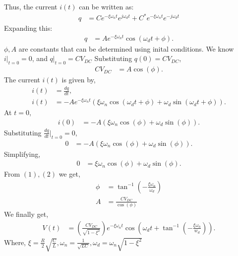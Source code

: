 \documentclass[a4paper,12pt]{article}
\begin{document}
Thus, the current $i(t)$ can be written as:
\begin{align*}
    q &= Ce^{-\xi \omega_n t} e^{j\omega_d t} + C^{*}e^{-\xi \omega_n t} e^{-j\omega_d t}
\end{align*}
Expanding this:
\begin{align*}
    q &=A e^{-\xi \omega_n t} \cos(\omega_d t + \phi) .
\end{align*}
$\phi, A$ are constants that can be determined using inital conditions. We know $i\Bigr|_{t=0} = 0$, and $q\Bigr|_{t=0} = CV_{DC}$\newline\newline
Substituting $q(0) = CV_{DC}$,
\begin{align*}
    CV_{DC} &= A \cos(\phi). \tag{1}
\end{align*}
The current $i(t)$ is given by,
\begin{align*}
    i(t) &= \frac{dq}{dt}, \\[5pt]
    i(t) &= -A e^{-\xi \omega_n t} (\xi \omega_n \cos(\omega_d t + \phi) + \omega_d \sin(\omega_d t + \phi)).
\end{align*}
At $t = 0$,
\begin{align*}
    i(0) &= -A (\xi \omega_n \cos(\phi) + \omega_d \sin(\phi)).
\end{align*}
Substituting $\frac{dq}{dt}\Bigr|_{t=0} = 0$,
\begin{align*}
    0 &= -A (\xi \omega_n \cos(\phi) + \omega_d \sin(\phi)).
\end{align*}
Simplifying,
\begin{align*}
    0 &= \xi \omega_n \cos(\phi) + \omega_d \sin(\phi). \tag{2}
\end{align*}
From $(1), (2)$ we get,
\begin{align*}
   \phi &= \tan^{-1}\left(-\frac{\xi \omega_n}{\omega_d}\right)\\
   A &= \frac{CV_{DC}}{\cos(\phi)}
\end{align*}
We finally get,
\begin{align*}
   V(t) &= \left(\frac{CV_{DC}}{\sqrt{1-\xi^2}} \right) e^{-\xi \omega_n t}\cos\left(\omega_d t + \tan^{-1}\left(-\frac{\xi \omega_n}{w_d}\right)\right). 
\end{align*}
Where, $\xi = \frac{R}{2}\sqrt{\frac{C}{L}}, \omega_n = \frac{1}{\sqrt{LC}}, \omega_d = \omega_n\sqrt{1-\xi^2}$
\end{document}
